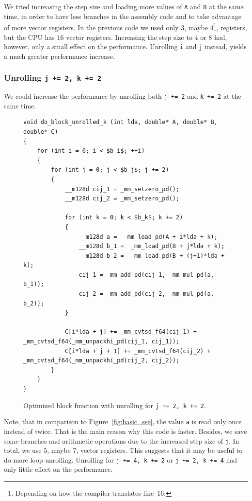 \documentclass[12pt]{article}
\begin{document}
We tried increasing the step size and loading more values of \lstinline{A} and \lstinline{B} at the same time, in order to have less branches in the assembly code and to take advantage of more vector registers. In the previous code we used only $3$, maybe $4$\footnote{Depending on how the compiler translates line~16.}, registers, but the CPU has $16$ vector registers. Increasing the step size to $4$ or $8$ had, however, only a small effect on the performance. Unrolling \lstinline{i} and \lstinline{j} instead, yields a much greater performance increase.

\subsubsection{Unrolling \lstinline{j += 2, k += 2}}
We could increase the performance by unrolling both \lstinline{j += 2} and \lstinline{k += 2} at the same time.

\begin{figure}[H]
\begin{lstlisting}[mathescape]
void do_block_unrolled_k (int lda, double* A, double* B, double* C)
{
	for (int i = 0; i < $b_i$; ++i)
	{
		for (int j = 0; j < $b_j$; j += 2)
		{
			__m128d cij_1 = _mm_setzero_pd();
			__m128d cij_2 = _mm_setzero_pd();

			for (int k = 0; k < $b_k$; k += 2)
			{
				__m128d a =  _mm_load_pd(A + i*lda + k);
				__m128d b_1 =  _mm_load_pd(B + j*lda + k);
				__m128d b_2 =  _mm_load_pd(B + (j+1)*lda + k);
				cij_1 = _mm_add_pd(cij_1, _mm_mul_pd(a, b_1)); 
				cij_2 = _mm_add_pd(cij_2, _mm_mul_pd(a, b_2)); 
			}

			C[i*lda + j] += _mm_cvtsd_f64(cij_1) + _mm_cvtsd_f64(_mm_unpackhi_pd(cij_1, cij_1));
			C[i*lda + j + 1] += _mm_cvtsd_f64(cij_2) + _mm_cvtsd_f64(_mm_unpackhi_pd(cij_2, cij_2));
		}
	}
}
\end{lstlisting}
\caption{Optimized block function with unrolling for \lstinline{j += 2, k += 2}.}
\label{fig:opt_1_sse}
\end{figure}

Note, that in comparison to Figure~\ref{fig:basic_sse}, the value \lstinline{a} is read only once instead of twice. That is the main reason why this code is faster. Besides, we save some branches and arithmetic operations due to the increased step size of \lstinline{j}. In total, we use $5$, maybe $7$, vector registers. This suggests that it may be useful to do more loop unrolling. Unrolling for \lstinline{j += 4, k += 2} or \lstinline{j += 2, k += 4} had only little effect on the performance.
\end{document}
